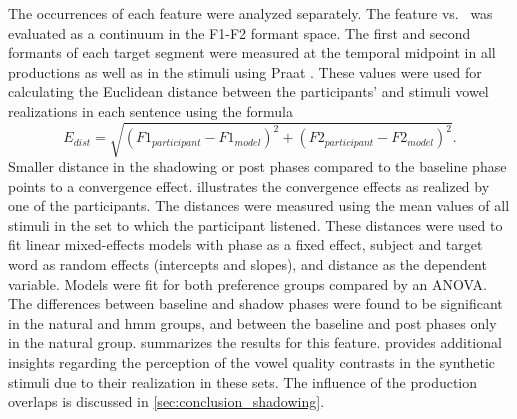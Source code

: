 The occurrences of each feature were analyzed separately.
The feature \textipa{[E:]} vs.\ \textipa{[e:]} was evaluated as a continuum in the F1-F2 formant space.
The first and second formants of each target segment were measured at the temporal midpoint in all productions as well as in the stimuli using Praat \citep{Boersma2018praat}. 
These values were used for calculating the Euclidean distance between the participants' and stimuli vowel realizations in each sentence using the formula
%
\begin{equation}
	E_{dist}=\sqrt{(F1_{participant}-F1_{model})^2+(F2_{participant}-F2_{model})^2}.
\end{equation}
\noindent
%
Smaller distance in the shadowing or post phases compared to the baseline phase points to a convergence effect.
 illustrates the convergence effects as realized by one of the participants.
The distances were measured using the mean values of all stimuli in the set to which the participant listened.
These distances were used to fit linear mixed-effects models with phase as a fixed effect, subject and target word as random effects (intercepts and slopes), and distance as the dependent variable.
Models were fit for both preference groups compared by an ANOVA.
The differences between baseline and shadow phases were found to be significant in the natural and \ac{hmm} groups, and between the baseline and post phases only in the natural group.
 summarizes the results for this feature.
 provides additional insights regarding the perception of the vowel quality contrasts in the synthetic stimuli due to their realization in these sets.
The influence of the production overlaps is discussed in \cref{sec:conclusion_shadowing}.
%
